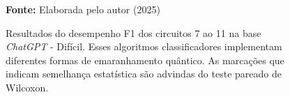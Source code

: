 \begin{figure}
\caption{Resultados do desempenho F1 dos circuitos 7 ao 11 na base \textit{ChatGPT} - Difícil. Esses algoritmos classificadores implementam diferentes formas de emaranhamento quântico. As marcações que indicam semelhança estatística são advindas do teste pareado de Wilcoxon.}
\label{fig:f1:hard:g2}
     \centering
    \centering

      \par\medskip\ABNTEXfontereduzida\selectfont\textbf{Fonte:} Elaborada pelo autor (2025) \par\medskip
\end{figure}